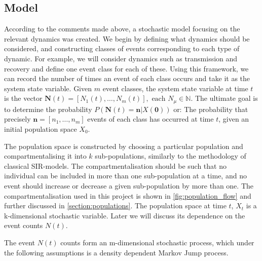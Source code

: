 \documentclass[10pt,a4paper]{article}
\begin{document}

\subsection{Model} \label{section:model}

According to the comments made above, a stochastic model focusing on the relevant dynamics was created. We begin by defining what dynamics should be considered, and constructing classes of events corresponding to each type of dynamic. For example, we will consider dynamics such as transmission and recovery and define one event class for each of these. Using this framework, we can record the number of times an event of each class occurs and take it as the system state variable. Given $m$ event classes, the system state variable at time $t$ is the vector $\bm{N}\left( t \right) = \left[ N_1 \left( t \right), \ldots, N_m \left( t \right) \right], \textrm{ each }N_\mu \in \mathbb{N}$. The ultimate goal is to determine the probability $P \left( \bm{N}\left( t \right)  = \bm{n} | X\left( \bm{0} \right) \right)$ or: The probability that precisely $\bm{n} = \left[ n_1, \ldots, n_m \right]$ events of each class has occurred at time $t$, given an initial population space $X_0$.

The population space is constructed by choosing a particular population and compartmentalising it into $k$ sub-populations, similarly to the methodology of classical SIR-models. The compartmentalisation should be such that no individual can be included in more than one sub-population at a time, and no event should increase or decrease a given sub-population by more than one. The compartmentalisation used in this project is shown in \cref{fig:population_flow} and further discussed in \cref{section:populations}. The population space at time $t$, $X_t$ is a k-dimensional stochastic variable. Later we will discuss its dependence on the event counts $N \left( t \right)$.

The event $N\left( t \right)$ counts form an m-dimensional stochastic process, which under the following assumptions is a density dependent Markov Jump process.
\end{document}
